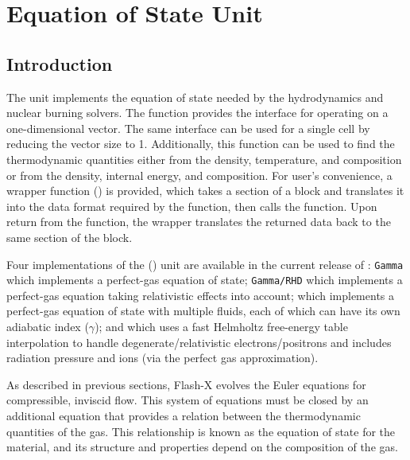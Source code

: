 \chapter{Equation of State Unit}
\label{Chp:EOS Unit}

\section{Introduction}
\label{Sec:Eos Intro}
The  unit implements the equation
of state needed by the hydrodynamics and nuclear burning solvers.
The function 
provides the interface for
operating on a
one-dimensional vector. The same interface can be used for a single
cell by reducing the vector size to 1. Additionally, this function
can be used to find the thermodynamic quantities either from the
density, temperature, and composition or from the density, internal
energy, and composition. For user's convenience,
a wrapper function () is provided, which
takes a section of a block and translates it into the data format required
by the  function, then calls the function. Upon
return from the  function, the wrapper translates the
returned data back to the same section of the block.

Four implementations of the () unit are available in the
current release of \flashx: \texttt{Gamma}
which implements a perfect-gas equation of state;
{\tt Gamma/RHD}%
which implements a perfect-gas equation taking relativistic effects into account; 
which implements a perfect-gas equation of state
with multiple fluids, each of which can have its own adiabatic index
($\gamma$); and %
which uses a fast Helmholtz free-energy table interpolation to handle
degenerate/relativistic electrons/positrons and includes
radiation pressure and ions (via the perfect gas approximation).

As described in previous sections,
Flash-X evolves the Euler equations for
compressible, inviscid flow. This system of equations must be closed
by an additional equation that provides a relation between the
thermodynamic quantities of the gas.  This relationship
is known as the equation of
state for the material, and its structure and properties depend on the
composition of the gas.

